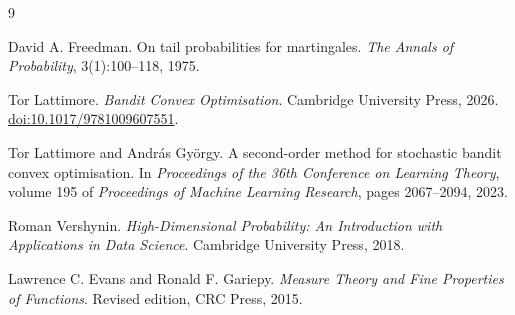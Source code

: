 \documentclass[11pt]{article}
\newcommand{\1}{\mathbf 1}
\begin{document}
\newpage
\begin{thebibliography}{9}
    \raggedright

    David A. Freedman.
    \newblock On tail probabilities for martingales.
    \newblock \emph{The Annals of Probability}, 3(1):100--118, 1975.

    Tor Lattimore.
    \newblock \emph{Bandit Convex Optimisation}.
    \newblock Cambridge University Press, 2026.
    \newblock \href{https://doi.org/10.1017/9781009607551}{doi:10.1017/9781009607551}.

    Tor Lattimore and Andr\'as Gy\"orgy.
    \newblock A second-order method for stochastic bandit convex optimisation.
    \newblock In \emph{Proceedings of the 36th Conference on Learning Theory},
    volume 195 of \emph{Proceedings of Machine Learning Research}, pages
    2067--2094, 2023.

    Roman Vershynin.
    \newblock \emph{High-Dimensional Probability: An Introduction with
        Applications in Data Science}.
    \newblock Cambridge University Press, 2018.


    Lawrence C. Evans and Ronald F. Gariepy.
    \newblock \emph{Measure Theory and Fine Properties of Functions}.
    \newblock Revised edition, CRC Press, 2015.

\end{thebibliography}

\newpage
\appendix
\end{document}
